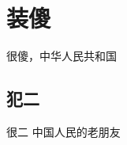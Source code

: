 \documentclass[a4paper]{article}
\begin{document}
\tableofcontents  %

\clearpage
\section{装傻}
很傻，中华人民共和国
\subsection{犯二}
很二
中国人民的老朋友
\end{document}

